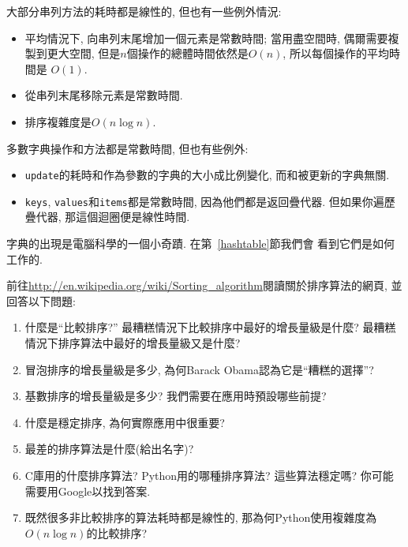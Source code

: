 \documentclass[10pt]{book}
\begin{document}
大部分串列方法的耗時都是線性的, 但也有一些例外情況:

\begin{itemize}

\item 平均情況下, 向串列末尾增加一個元素是常數時間;
當用盡空間時, 偶爾需要複製到更大空間, 
但是$n$個操作的總體時間依然是$O(n)$, 所以每個操作的平均時間是
$O(1)$. 

\item 從串列末尾移除元素是常數時間.

\item 排序複雜度是$O(n \log n)$.

\end{itemize}

多數字典操作和方法都是常數時間, 但也有些例外:

\begin{itemize}

\item {\tt update}的耗時和作為參數的字典的大小成比例變化, 而和被更新的字典無關. 

\item {\tt keys}, {\tt values}和{\tt items}都是常數時間, 因為他們都是返回疊代器. 
但如果你遍歷疊代器, 那這個迴圈便是線性時間. 

\end{itemize}

字典的出現是電腦科學的一個小奇蹟. 在第~\ref{hashtable}節我們會
看到它們是如何工作的. 

\begin{exercise}

前往\url{http://en.wikipedia.org/wiki/Sorting_algorithm}閱讀關於排序算法的網頁, 
並回答以下問題:

\begin{enumerate}

\item 什麼是``比較排序?'' 最糟糕情況下比較排序中最好的增長量級是什麼? 
最糟糕情況下排序算法中最好的增長量級又是什麼?

\item 冒泡排序的增長量級是多少, 為何Barack Obama認為它是``糟糕的選擇''?

\item 基數排序的增長量級是多少? 我們需要在應用時預設哪些前提?

\item 什麼是穩定排序, 為何實際應用中很重要?

\item 最差的排序算法是什麼(給出名字)?

\item C庫用的什麼排序算法? Python用的哪種排序算法? 這些算法穩定嗎?
你可能需要用Google以找到答案.

\item 既然很多非比較排序的算法耗時都是線性的, 
那為何Python使用複雜度為$O(n \log n)$的比較排序?

\end{enumerate}

\end{exercise}
\end{document}
